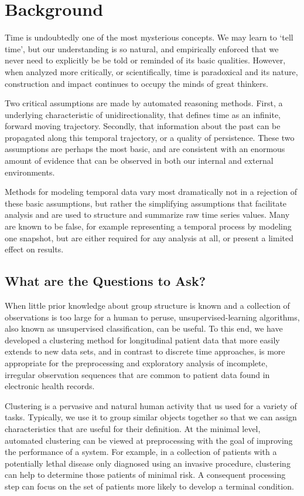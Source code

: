 \chapter{Background}
\label{ch:temporal_dynamics}

Time is undoubtedly one of the most mysterious concepts.  We may learn to `tell time', but our understanding is so natural, and empirically enforced that we never need to explicitly be be told or reminded of its basic qualities.  However, when analyzed more critically, or scientifically, time is paradoxical and its nature, construction and impact continues to occupy the minds of great thinkers.

Two critical assumptions are made by automated reasoning methods. First, a underlying characteristic of unidirectionality, that defines time as an infinite, forward moving trajectory.  Secondly, that information about the past can be propagated along this temporal trajectory, or a quality of persistence.  These two assumptions are perhaps the most basic, and are consistent with an enormous amount of evidence that can be observed in both our internal and external environments.

Methods for modeling temporal data vary most dramatically not in a rejection of these basic assumptions, but rather the simplifying assumptions that facilitate analysis and are used to structure and summarize raw time series values.  Many are known to be false, for example representing a temporal process by modeling one snapshot, but are either required for any analysis at all, or present a limited effect on results.

\section{What are the Questions to Ask?}
When little prior knowledge about group structure is known and a collection of observations is too large for a human to peruse, unsupervised-learning algorithms, also known as unsupervised classification, can be useful.  To this end, we have developed a clustering method for longitudinal patient data that more easily extends to new data sets, and in contrast to discrete time approaches, is more appropriate for the preprocessing and exploratory analysis of incomplete, irregular observation sequences that are common to patient data found in electronic health records.

Clustering is a pervasive and natural human activity that us used for a variety of tasks. Typically, we use it to group similar objects together so that we can assign characteristics that are useful for their definition.   At the minimal level, automated clustering can be viewed at preprocessing with the goal of improving the performance of a system.  For example, in a collection of patients with a potentially lethal disease only diagnosed using an invasive procedure, clustering can help to determine those patients of minimal risk.  A consequent processing step can focus on the set of patients more likely to develop a terminal condition.

